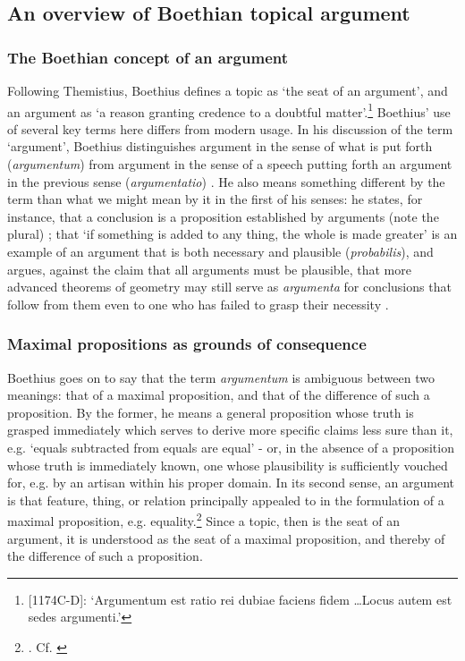 \documentclass[a4paper, 11pt]{article}
\begin{document}
\subsection{An overview of Boethian topical argument}
\subsubsection{The Boethian concept of an argument}
Following Themistius, Boethius defines a topic as `the seat of an argument', and an argument as `a reason granting credence to a doubtful matter'.\footnote{[1174C-D]\autocite{BDT}: `Argumentum est ratio rei dubiae faciens fidem \ldots Locus autem est sedes argumenti.'} Boethius' use of several key terms here differs from modern usage. In his discussion of the term `argument', Boethius distinguishes argument in the sense of what is put forth (\emph{argumentum}) from argument in the sense of a speech putting forth an argument in the previous sense (\emph{argumentatio}) \autocite[1174C]{BDT}. He also means something different by the term than what we might mean by it in the first of his senses: he states, for instance, that a conclusion is a proposition established by arguments (note the plural) \autocite[1180C]{BDT}; that `if something is added to any thing, the whole is made greater' is an example of an argument that is both necessary and plausible (\emph{probabilis}), and argues, against the claim that all arguments must be plausible, that more advanced theorems of geometry may still serve as \emph{argumenta} for conclusions that follow from them even to one who has failed to grasp their necessity \autocite[1181A-C]{BDT}. 

\subsubsection{Maximal propositions as grounds of consequence}
Boethius goes on to say that the term \emph{argumentum} is ambiguous between two meanings: that of a maximal proposition, and that of the difference of such a proposition. By the former, he means a general proposition whose truth is grasped immediately which serves to derive more specific claims less sure than it, e.g. `equals subtracted from equals are equal' - or, in the absence of a proposition whose truth is immediately known, one whose plausibility is sufficiently vouched for, e.g. by an artisan within his proper domain. In its second sense, an argument is that feature, thing, or relation principally appealed to in the formulation of a maximal proposition, e.g. equality.\footnote{\autocite[1185A-B]{BDT}. Cf. \autocite{Holopainen2007,Archambault2017e}} Since a topic, then is the seat of an argument, it is understood as the seat of a maximal proposition, and thereby of the difference of such a proposition. 
\end{document}
